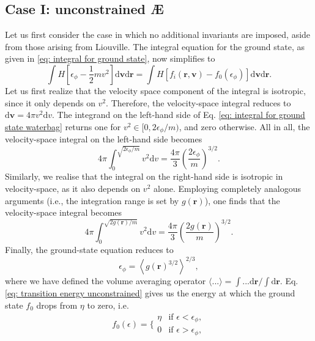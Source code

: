 \subsection*{Case I: unconstrained \AE{}}
Let us first consider the case in which no additional invariants are imposed, aside from those arising from Liouville. The integral equation for the ground state, as given in \eqref{eq: integral for ground state}, now simplifies to
\begin{equation}
    \int H \left[\epsilon_\phi - \frac{1}{2}mv^2 \right] \mathrm{d} \boldsymbol{v}\mathrm{d} \boldsymbol{r} = \int H[f_i(\boldsymbol{r},\boldsymbol{v}) - f_0(\epsilon_\phi)] \mathrm{d} \boldsymbol{v}\mathrm{d} \boldsymbol{r}.
    \label{eq: integral for ground state waterbag}
\end{equation}
Let us first realize that the velocity space component of the integral is isotropic, since it only depends on $v^2$. Therefore, the velocity-space integral reduces to $\mathrm{d}\boldsymbol{v}=4\pi v^2 \mathrm{d}v$. The integrand on the left-hand side of Eq. \eqref{eq: integral for ground state waterbag} returns one for $v^2 \in [0,2 \epsilon_\phi/m)$, and zero otherwise. All in all, the velocity-space integral on the left-hand side becomes
\begin{equation}
    4 \pi\int_0^{\sqrt{2 \epsilon_\phi/m}} v^2 \mathrm{d}v = \frac{4 \pi}{3} \left( \frac{2 \epsilon_\phi}{m} \right)^{3/2}.
\end{equation}
Similarly, we realise that the integral on the right-hand side is isotropic in velocity-space, as it also depends on $v^2$ alone. Employing completely analogous arguments (i.e., the integration range is set by $g(\boldsymbol{r})$), one finds that the velocity-space integral becomes
\begin{equation}
    4 \pi \int_0^{\sqrt{2g(\boldsymbol{r})/m}} v^2 \mathrm{d} v =   \frac{4 \pi}{3} \left( \frac{2 g(\boldsymbol{r})}{m} \right)^{3/2}.
\end{equation}
Finally, the ground-state equation reduces to
\begin{equation}
    \epsilon_\phi = \left \langle g(\boldsymbol{r})^{3/2} \right\rangle^{2/3},
    \label{eq: transition energy unconstrained}
\end{equation}
where we have defined the volume averaging operator $\langle ... \rangle = \int ... \mathrm{d} \boldsymbol{r} / \int \mathrm{d} \boldsymbol{r}$. Eq. \eqref{eq: transition energy unconstrained} gives us the energy at which the ground state $f_0$ drops from $\eta$ to zero, i.e.
\begin{equation}
f_0(\epsilon) = 
\Bigg\{
    \begin{array}{lr}
        \eta & \text{if } \epsilon < \epsilon_\phi, \\
        0 &   \text{if } \epsilon > \epsilon_\phi, 
    \end{array}
\end{equation}
